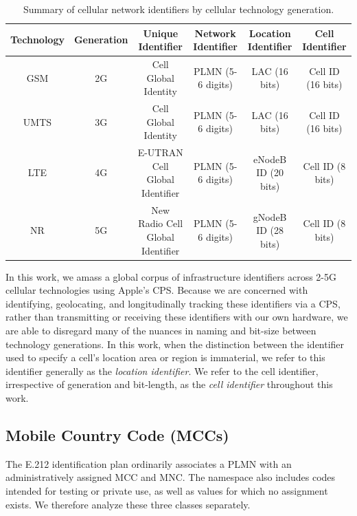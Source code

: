 \begin{table}[h]
\caption{Summary of cellular network identifiers by cellular technology generation.}
\label{tab:cellids}
\begin{tabular}{c|c|c|c|c|c}
\textbf{Technology} & \textbf{Generation} & \textbf{Unique Identifier}       &
    \textbf{Network Identifier} & \textbf{Location Identifier} & \textbf{Cell Identifier} \\
\hline
GSM                 & 2G                  & Cell Global Identity             & PLMN (5-6 digits)           & LAC (16 bits)                & Cell ID (16 bits)        \\
UMTS                & 3G                  & Cell Global Identity             & PLMN (5-6 digits)           & LAC (16 bits)                & Cell ID (16 bits)        \\
LTE                 & 4G                  & E-UTRAN Cell Global Identifier   & PLMN (5-6 digits)           & eNodeB ID (20 bits)          & Cell ID (8 bits)         \\
NR                  & 5G                  & New Radio Cell Global Identifier & PLMN (5-6 digits)           & gNodeB ID (28 bits)          & Cell ID (8 bits)        
\end{tabular}
\end{table} 

In this work, we amass a global corpus of infrastructure identifiers across 2-5G
cellular technologies using Apple's \ac{CPS}. Because we are concerned with
identifying, geolocating, and longitudinally tracking these identifiers via a
\ac{CPS}, rather than transmitting or receiving these identifiers with our own
hardware, we are able to disregard many of the nuances in naming and bit-size
between technology generations. In this work, when the distinction between the
identifier used to specify a cell's location area or region is immaterial, we
refer to this identifier generally as the \emph{location identifier}. We refer
to the cell identifier, irrespective of generation and bit-length, as the
\emph{cell identifier} throughout this work. 

\subsection{Mobile Country Code (MCCs)}
\label{sec:mccs}


The E.212 identification plan ordinarily associates a \ac{PLMN} with an
administratively assigned \ac{MCC} and \ac{MNC}. The namespace also includes
codes intended for testing or private use, as well as values for which no
assignment exists. We therefore analyze these three classes separately.

